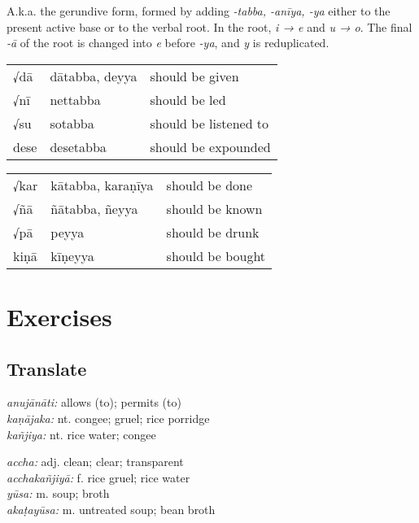 \documentclass[11pt,oneside]{memoir}
\begin{document}
A.k.a. the gerundive form, formed by adding \emph{-tabba, -anīya, -ya} either to the
present active base or to the verbal root. In the root, \emph{i → e} and \emph{u → o}.
The final \emph{-ā} of the root is changed into \emph{e} before \emph{-ya}, and \emph{y} is reduplicated.

\bigskip
{\centering\par
\begin{multicols}{2}

\begin{center}
\begin{tabular}{lll}
√dā & dātabba, deyya & should be given\\[0pt]
√nī & nettabba & should be led\\[0pt]
√su & sotabba & should be listened to\\[0pt]
dese & desetabba & should be expounded\\[0pt]
\end{tabular}
\end{center}

\columnbreak

\begin{center}
\begin{tabular}{lll}
√kar & kātabba, karaṇīya & should be done\\[0pt]
√ñā & ñātabba, ñeyya & should be known\\[0pt]
√pā & peyya & should be drunk\\[0pt]
kiṇā & kīṇeyya & should be bought\\[0pt]
\end{tabular}
\end{center}

\end{multicols}
\par}

\section{Exercises}
\label{sec:org67fb3a3}
\subsection{Translate}
\label{sec:org670fb09}

\begin{twocols}


\emph{anujānāti:} allows (to); permits (to) \\[0pt]
\emph{kaṇājaka:} nt. congee; gruel; rice porridge \\[0pt]
\emph{kañjiya:} nt. rice water; congee

\columnbreak

\emph{accha:} adj. clean; clear; transparent \\[0pt]
\emph{acchakañjiyā:} f. rice gruel; rice water \\[0pt]
\emph{yūsa:} m. soup; broth \\[0pt]
\emph{akaṭayūsa:} m. untreated soup; bean broth
\end{twocols}
\end{document}
